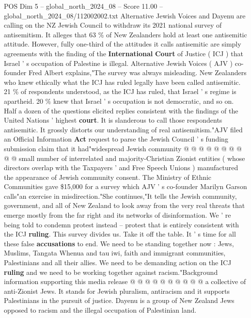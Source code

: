 \begin{textsample}{POS Dim 5 – global\_north\_2024\_08 – Score 11.00 – global\_north\_2024\_08/112002002.txt}  \label{ex:f5_pos_395}
Alternative Jewish Voices and Dayenu are calling on the NZ Jewish Council to withdraw its 2021 national survey of antisemitism.
It alleges that 63 \% of New Zealanders hold at least one antisemitic attitude.
However, fully one-third of the attitudes it calls antisemitic are simply agreements with the finding of the \textbf{International} \textbf{Court} of Justice ( ICJ ) that Israel ' s occupation of Palestine is illegal.
Alternative Jewish Voices ( AJV ) co-founder Fred Albert explains,"The survey was always misleading.
New Zealanders who knew ethically what the ICJ has ruled legally have been called antisemitic. 21 \% of respondents understood, as the ICJ has ruled, that Israel ' s regime is apartheid. 20 \% knew that Israel ' s occupation is not democratic, and so on.
Half a dozen of the questions elicited replies consistent with the findings of the United Nations ' highest \textbf{court}.
It is slanderous to call those respondents antisemitic.
It grossly distorts our understanding of real antisemitism."AJV filed an Official Information \textbf{Act} request to parse the Jewish Council ' s funding submission claim that it had"widespread Jewish community @ @ @ @ @ @ @ @ @ @ small number of interrelated and majority-Christian Zionist entities ( whose directors overlap with the Taxpayers ' and Free Speech Unions ) manufactured the appearance of Jewish community consent.
The Ministry of Ethnic Communities gave \$15,000 for a survey which AJV ' s co-founder Marilyn Garson calls"an exercise in misdirection."She continues,"It tells the Jewish community, government, and all of New Zealand to look away from the very real threats that emerge mostly from the far right and its networks of disinformation.
We ' re being told to condemn protest instead -- protest that is entirely consistent with the ICJ \textbf{ruling}.
This survey divides us.
Take it off the table.
It ' s time for all these false \textbf{accusations} to end.
We need to be standing together now : Jews, Muslims, Tangata Whenua and tau iwi, faith and immigrant communities, Palestinians and all their allies.
We need to be demanding action on the ICJ \textbf{ruling} and we need to be working together against racism."Background information supporting this media release @ @ @ @ @ @ @ @ @ @ a collective of anti-Zionist Jews.
It stands for Jewish pluralism, antiracism and it supports Palestinians in the pursuit of justice.
Dayenu is a group of New Zealand Jews opposed to racism and the illegal occupation of Palestinian land.

\end{textsample}
